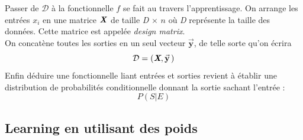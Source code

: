 \documentclass[a4paper,12pt]{report}
\newcommand{\bepar}[1]{
	\left( #1 \right)  
}
\newcommand\bk{\color{black}}
\newcommand\brick{\color{brick}}
\numberwithin{equation}{section} %
\begin{document}
\noindent Passer de $\mathcal{D}$ à la fonctionnelle $f$ se fait au travers l'apprentissage. On arrange les entrées $x_i$ en une matrice $\textbf{\textit{X}}$ de taille \textit{D}$\, \times \,n$ où \textit{D} représente la taille des données. Cette matrice est appelée \textit{design matrix}.\\
On concatène toutes les sorties en un seul vecteur $\vec{\textbf{y}}$, de telle sorte qu'on écrira 
\begin{equation}
\mathcal{D} = \bepar{\textit{\textbf{X}}, \vec{\textbf{y}}\,}
\end{equation}
Enfin déduire une fonctionnelle liant entrées et sorties revient à établir une distribution de probabilités conditionnelle donnant la sortie sachant l'entrée :
\begin{equation}
P \bepar{S | E}
\end{equation}

\brick \subsection{Learning en utilisant des poids} \bk
\end{document}
